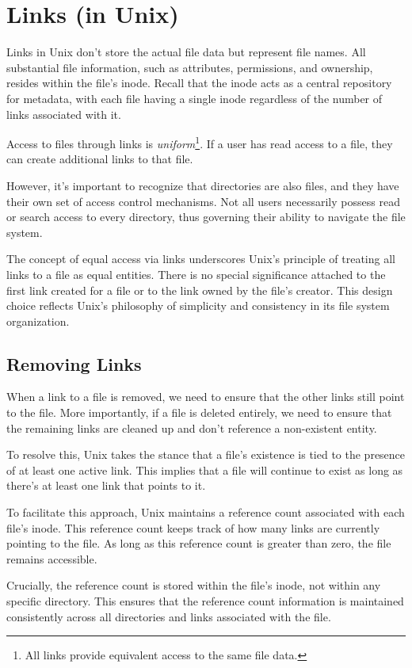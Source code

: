 \documentclass{report}
\begin{document}
\section{Links (in Unix)}
Links in Unix don't store the actual file data but represent file names. All substantial file
information, such as attributes, permissions, and ownership, resides within the file's inode. Recall
that the inode acts as a central repository for metadata, with each file having a single inode
regardless of the number of links associated with it.

Access to files through links is \textit{uniform}\footnote{All links provide equivalent access to the
same file data.}. If a user has read access to a file, they can create additional links to that
file.

However, it's important to recognize that directories are also files, and they have their own
set of access control mechanisms. Not all users necessarily possess read or search access to every
directory, thus governing their ability to navigate the file system.

The concept of equal access via links underscores Unix's principle of treating all links to a file
as equal entities. There is no special significance attached to the first link created for a file or
to the link owned by the file's creator. This design choice reflects Unix's philosophy of simplicity
and consistency in its file system organization.


\subsection{Removing Links}
When a link to a file is removed, we need to ensure that the other links still point to the
file. More importantly, if a file is deleted entirely, we need to ensure that the remaining links
are cleaned up and don't reference a non-existent entity.

To resolve this, Unix takes the stance that a file's existence is tied to the presence of at least
one active link. This implies that a file will continue to exist as long as there's at least one
link that points to it.

To facilitate this approach, Unix maintains a reference count associated with each file's
inode. This reference count keeps track of how many links are currently pointing to the file. As
long as this reference count is greater than zero, the file remains accessible.

Crucially, the reference count is stored within the file's inode, not within any specific
directory. This ensures that the reference count information is maintained consistently across all
directories and links associated with the file.
\end{document}
